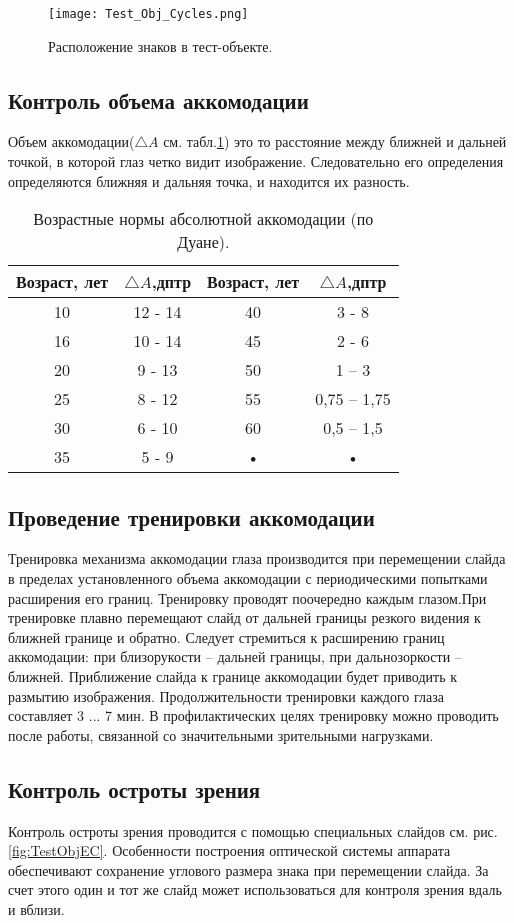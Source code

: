 \begin{figure}[ht]
	\centering
	\texttt{[image: Test\_Obj\_Cycles.png]}
	\caption{Расположение знаков в тест-объекте.}
	\label{fig:TestObjC}
\end{figure}
\subsection{Контроль объема аккомодации}
Объем аккомодации($\triangle A$ см. табл.\ref{tab:AccDuane}) это то расстояние между ближней и дальней точкой, в которой глаз четко видит изображение. Следовательно его определения определяются ближняя и дальняя точка, и находится их разность.
\begin{table}
\centering
\begin{tabular}{|c|c|c|c|}
\hline 
Возраст, лет &$\triangle A$,дптр & Возраст, лет & $\triangle A$,дптр \\ 
\hline 
10 & 12 - 14 & 40 & 3 - 8 \\ 
\hline 
16 & 10 - 14 & 45 & 2 - 6 \\ 
\hline 
20 & 9 - 13 & 50 & 1 – 3 \\ 
\hline 
25 & 8 - 12 & 55 & 0,75 – 1,75 \\ 
\hline 
30 & 6 - 10 & 60 & 0,5 – 1,5 \\ 
\hline 
35 & 5 - 9 & • & • \\ 
\hline 
\end{tabular} 
\caption{Возрастные нормы абсолютной аккомодации (по Дуане).}
\label{tab:AccDuane}
\end{table}
\subsection{Проведение тренировки аккомодации}
Тренировка механизма аккомодации глаза производится при перемещении слайда в пределах установленного объема аккомодации с периодическими попытками расширения его границ. Тренировку проводят поочередно каждым глазом.При тренировке плавно перемещают слайд от дальней границы резкого видения к ближней границе и обратно. Следует стремиться к расширению границ аккомодации: при близорукости – дальней границы, при дальнозоркости – ближней. Приближение слайда к границе аккомодации будет приводить к размытию изображения.  Продолжительности тренировки каждого глаза составляет 3 ... 7 мин. В профилактических целях тренировку можно проводить после работы, связанной со значительными зрительными нагрузками.
\subsection{Контроль остроты зрения}
Контроль остроты зрения проводится с помощью специальных слайдов см. рис.\ref{fig:TestObjEC}. Особенности построения оптической системы аппарата обеспечивают сохранение углового размера знака при перемещении слайда. За счет этого один и тот же слайд может использоваться для контроля зрения вдаль и вблизи.

